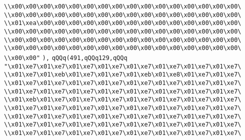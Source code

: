 \verb|\\x00\x00\x00\x00\x00\x00\x00\x00\x00\x00\x00\x00\x00\x00\x00\x00\|\newline
\verb|\\x00\x00\x00\x00\x00\x00\x00\x00\x00\x00\x00\x00\x00\x00\x00\x00\|\newline
\verb|\\x01\xea\x00\x00\x00\x00\x00\x00\x00\x00\x00\x00\x00\x00\x00\x00\|\newline
\verb|\\x00\x00\x00\x00\x00\x00\x00\x00\x00\x00\x00\x00\x00\x00\x00\x00\|\newline
\verb|\\x00\x00\x00\x00\x00\x00\x00\x00\x00\x00\x00\x00\x00\x00\x00\x00\|\newline
\verb|\\x00\x00\x00\x00\x00\x00\x00\x00\x00\x00\x00\x00\x00\x00\x00\x00\|\newline
\verb|\\x00\x00"|\newline
\verb|),|\newline
\verb|qQQq(491,qQQq129,qQQq|\newline
\verb|"\x01\xe7\x01\xe7\x01\xe7\x01\xe7\x01\xe7\x01\xe7\x01\xe7\x01\xe7\|\newline
\verb|\\x01\xe7\x01\xeb\x01\xe7\x01\xe7\x01\xeb\x01\xe8\x01\xe7\x01\xe7\|\newline
\verb|\\x01\xe7\x01\xe7\x01\xe7\x01\xe7\x01\xe7\x01\xe7\x01\xe7\x01\xe7\|\newline
\verb|\\x01\xe7\x01\xe7\x01\xe7\x01\xe7\x01\xe7\x01\xe7\x01\xe7\x01\xe7\|\newline
\verb|\\x01\xeb\x01\xe7\x01\xe7\x01\xe7\x01\xe7\x01\xe7\x01\xe7\x01\xe7\|\newline
\verb|\\x01\xe7\x01\xe7\x01\xe7\x01\xe7\x01\xe7\x01\xe7\x01\xe7\x01\xe7\|\newline
\verb|\\x01\xe7\x01\xe7\x01\xe7\x01\xe7\x01\xe7\x01\xe7\x01\xe7\x01\xe7\|\newline
\verb|\\x01\xe7\x01\xe7\x01\xe7\x01\xe7\x01\xe7\x01\xe7\x01\xe7\x01\xe7\|\newline
\verb|\\x01\xe7\x01\xe7\x01\xe7\x01\xe7\x01\xe7\x01\xe7\x01\xe7\x01\xe7\|\newline
